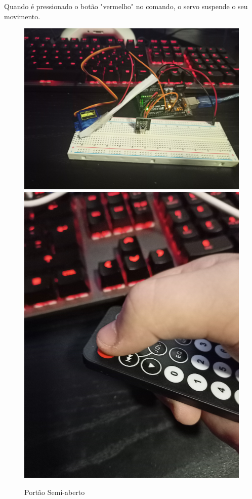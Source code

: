 Quando é pressionado o botão "vermelho" no comando, o servo suspende o seu movimento.

\begin{figure}[H]
    \centering
    
    \includegraphics[scale=0.03]{images/testes/sisC_semiOpen.jpg}
    \includegraphics[scale=0.0225]{images/testes/controllerOff.jpg}
    \caption{Portão Semi-aberto}
\end{figure}


